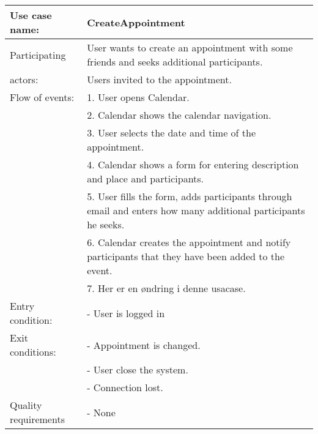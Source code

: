 {\tabulinesep=1.2mm
\begin{tabu}{ | p{3cm} | p{13cm} |}
    \hline
    Use case name: 			& 		CreateAppointment\\ \hline
    Participating  			& 		User wants to create an appointment with some friends and seeks additional participants. \\
    actors:					&		Users invited to the appointment.\\ \hline
    Flow of events: 		& 		1. User opens Calendar. \\
							&		2. Calendar shows the calendar navigation.\\
							&		3. User selects the date and time of the appointment.\\
							&		4. Calendar shows a form for entering description and place and participants.\\
							&		5. User fills the form, adds participants through email and enters how many additional participants he seeks.\\
							&		6. Calendar creates the appointment and notify participants that they have been added to the event.\\
							&		7. Her er en øndring i denne usacase.\\ \hline
    Entry condition: 		& 		- User is logged in  \\ \hline
	Exit conditions: 		&		- Appointment is changed.\\
							&		- User close the system.\\
							&		- Connection lost.\\\hline
	Quality requirements	&	 	- None \\\hline
\end{tabu}
}